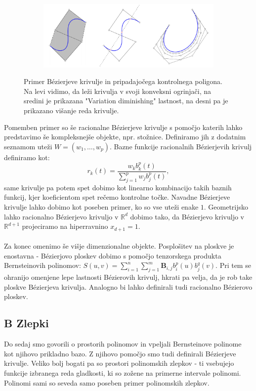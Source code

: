 \documentclass{article}
\begin{document}
\begin{figure}[H]
\centering
\begin{subfigure}{.8\textwidth}
\includegraphics[width=\linewidth]{Slike/Bezier.png}
\end{subfigure}
\caption{Primer Bézierjeve krivulje in pripadajočega kontrolnega poligona. Na levi vidimo, da leži krivulja v svoji konveksni ogrinjači, na sredini je prikazana "Variation diminishing" lastnost, na desni pa je prikazano višanje reda krivulje.}
\label{fig:bezier}
\end{figure}
Pomemben primer so še racionalne Bézierjeve krivulje s pomočjo katerih lahko predstavimo še kompleksnejše objekte, npr. stožnice.
Definiramo jih z dodatnim seznamom uteži $W = (w_1, \dots , w_p)$.
Bazne funkcije racionalnih Bézierjevih krivulj definiramo kot:
\begin{equation}
r_k(t) = \frac{w_k b_k^p (t)}{\sum_{j=1}^p w_j b_j^p (t)},
\end{equation}
same krivulje pa potem spet dobimo kot linearno kombinacijo takih baznih funkcij, kjer koeficientom spet rečemo kontrolne točke. Navadne Bézierjeve krivulje lahko dobimo kot poseben primer, ko so vse uteži enake $1$. Geometrijsko lahko racionalno Bézierjevo krivuljo v $\mathbb{R}^d$ dobimo tako, da Bézierjevo krivuljo v $\mathbb{R}^{d+1}$ projeciramo na hiperravnino $x_{d+1}=1$.
\\
\\
Za konec omenimo še višje dimenzionalne objekte. Posplošitev na ploskve je enostavna - Bézierjovo ploskev dobimo s pomočjo tenzorskega produkta Bernsteinovih polinomov:
$S(u, v) = \sum_{i=1}^n \sum_{j=1}^m \textbf{B}_{i,j} b_i^p (u) b_j^q (v)$.
Pri tem se ohranijo omenjene lepe lastnosti Bézierovih krivulj, hkrati pa velja, da je rob take ploskve Bézierjeva krivulja. Analogno bi lahko definirali tudi racionalno Bézierovo ploskev.

\subsection{B Zlepki}
Do sedaj smo govorili o prostorih polinomov in vpeljali Bernsteinove polinome kot njihovo prikladno bazo. Z njihovo pomočjo smo tudi definirali Bézierjeve krivulje.
Veliko bolj bogati pa so prostori polinomskih zlepkov - ti vsebujejo funkcije izbranega reda gladkosti, ki so zožene na primerne intervale polinomi. Polinomi sami so seveda samo poseben primer polinomskih zlepkov.
\end{document}
